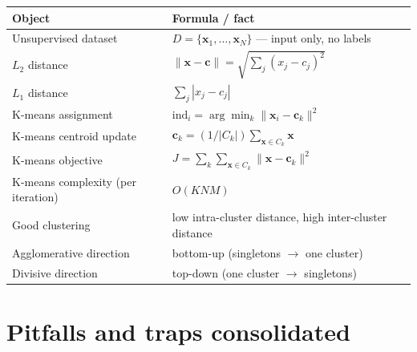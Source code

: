 \documentclass[11pt, a4paper]{article}
\newcommand{\thead}[1]{\textbf{#1}}
\begin{document}
\begin{tabularx}{\linewidth}{@{}lX@{}}
\toprule
\thead{Object} & \thead{Formula / fact} \\
\midrule
Unsupervised dataset       & $D = \{\mathbf{x}_1, \ldots, \mathbf{x}_N\}$ — input only, no labels \\
$L_2$ distance            & $\|\mathbf{x}-\mathbf{c}\| = \sqrt{\sum_j (x_j - c_j)^2}$ \\
$L_1$ distance            & $\sum_j |x_j - c_j|$ \\
K-means assignment        & $\mathrm{ind}_i = \arg\min_k \|\mathbf{x}_i - \mathbf{c}_k\|^2$ \\
K-means centroid update   & $\mathbf{c}_k = (1/|C_k|)\sum_{\mathbf{x}\in C_k}\mathbf{x}$ \\
K-means objective         & $J = \sum_k \sum_{\mathbf{x}\in C_k}\|\mathbf{x}-\mathbf{c}_k\|^2$ \\
K-means complexity (per iteration) & $O(KNM)$ \\
Good clustering           & low intra-cluster distance, high inter-cluster distance \\
Agglomerative direction   & bottom-up (singletons $\to$ one cluster) \\
Divisive direction        & top-down (one cluster $\to$ singletons) \\
\bottomrule
\end{tabularx}

\section*{Pitfalls and traps consolidated}
\end{document}
